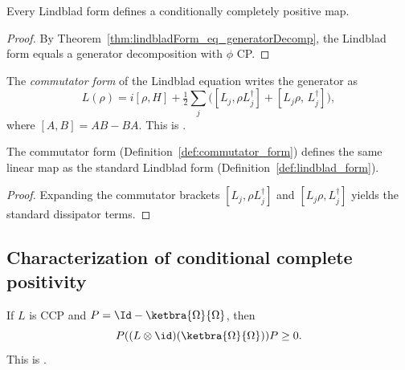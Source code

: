 \begin{theorem}
    \label{thm:lindbladForm_isCCP}
    \leanok
    Every Lindblad form defines a conditionally completely positive map.
\end{theorem}

\begin{proof}
    \leanok
    By Theorem~\ref{thm:lindbladForm_eq_generatorDecomp}, the Lindblad
    form equals a generator decomposition with $\phi$ CP.
\end{proof}

\begin{definition}\label{def:commutator_form}
    \leanok
    The \emph{commutator form} of the Lindblad equation writes
    the generator as
    \[
        L(\rho)
        = i[\rho, H]
        + \tfrac{1}{2}\sum_{j}
        \bigl([L_j, \rho L_j^\dagger]
        + [L_j\rho,\,L_j^\dagger]\bigr),
    \]
    where $[A,B] = AB - BA$.
    This is \cite[Equation~(7.22)]{Wolf2012Quantum}.
\end{definition}

\begin{theorem}
    \label{thm:commutatorForm_eq_toLinearMap}
    \leanok
    The commutator form (Definition~\ref{def:commutator_form}) defines
    the same linear map as the standard Lindblad form
    (Definition~\ref{def:lindblad_form}).
\end{theorem}

\begin{proof}\leanok
    Expanding the commutator brackets
    $[L_j, \rho L_j^\dagger]$ and $[L_j\rho, L_j^\dagger]$
    yields the standard dissipator terms.
\end{proof}

\subsection{Characterization of conditional complete positivity}

\begin{theorem}
    \label{thm:ccp_implies_choi_projected}
    \leanok
    If $L$ is CCP and $P = \Id - \ketbra{\Omega}{\Omega}$, then
    \[
        P((L \otimes \id)(\ketbra{\Omega}{\Omega}))P \ge 0.
    \]
    This is \cite[Proposition~7.2]{Wolf2012Quantum}.
\end{theorem}

